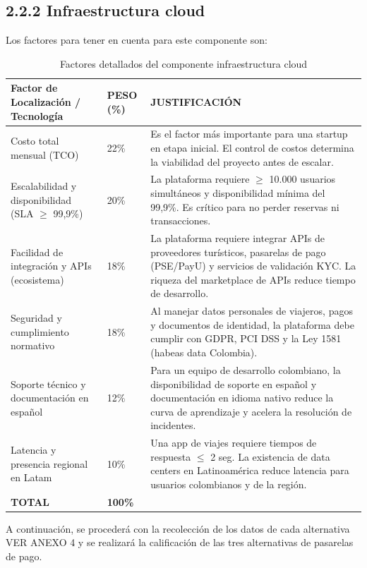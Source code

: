 \documentclass[12pt,a4paper]{article}
\newcommand{\subsectiontitle}[1]{\subsection{#1}}
\begin{document}
\subsectiontitle{2.2.2 Infraestructura cloud}

Los factores para tener en cuenta para este componente son:

\begin{table}[H]
\centering
\begin{tabular}{p{4cm}p{2cm}p{6cm}}
\toprule
\textbf{Factor de Localización / Tecnología} & \textbf{PESO (\%)} & \textbf{JUSTIFICACIÓN} \\
\midrule
Costo total mensual (TCO) & 22\% & Es el factor más importante para una startup en etapa inicial. El control de costos determina la viabilidad del proyecto antes de escalar. \\
\addlinespace
Escalabilidad y disponibilidad (SLA $\geq$ 99,9\%) & 20\% & La plataforma requiere $\geq$ 10.000 usuarios simultáneos y disponibilidad mínima del 99,9\%. Es crítico para no perder reservas ni transacciones. \\
\addlinespace
Facilidad de integración y APIs (ecosistema) & 18\% & La plataforma requiere integrar APIs de proveedores turísticos, pasarelas de pago (PSE/PayU) y servicios de validación KYC. La riqueza del marketplace de APIs reduce tiempo de desarrollo. \\
\addlinespace
Seguridad y cumplimiento normativo & 18\% & Al manejar datos personales de viajeros, pagos y documentos de identidad, la plataforma debe cumplir con GDPR, PCI DSS y la Ley 1581 (habeas data Colombia). \\
\addlinespace
Soporte técnico y documentación en español & 12\% & Para un equipo de desarrollo colombiano, la disponibilidad de soporte en español y documentación en idioma nativo reduce la curva de aprendizaje y acelera la resolución de incidentes. \\
\addlinespace
Latencia y presencia regional en Latam & 10\% & Una app de viajes requiere tiempos de respuesta $\leq$ 2 seg. La existencia de data centers en Latinoamérica reduce latencia para usuarios colombianos y de la región. \\
\bottomrule
\textbf{TOTAL} & \textbf{100\%} & \\
\end{tabular}
\caption{Factores detallados del componente infraestructura cloud}
\end{table}

A continuación, se procederá con la recolección de los datos de cada alternativa VER ANEXO 4 y se realizará la calificación de las tres alternativas de pasarelas de pago.
\end{document}
